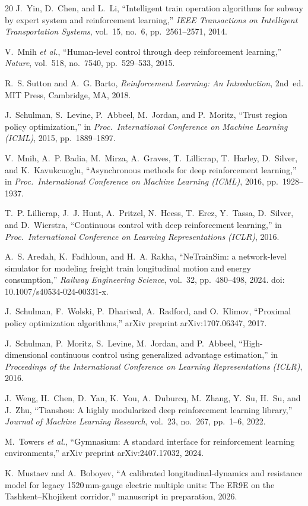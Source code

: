 \documentclass[11pt,a4paper]{article}
\begin{document}
\begin{thebibliography}{20}
J.~Yin, D.~Chen, and L.~Li,
``Intelligent train operation algorithms for subway by expert system and
reinforcement learning,''
\emph{IEEE Transactions on Intelligent Transportation Systems}, vol.~15,
no.~6, pp.~2561--2571, 2014.

V.~Mnih \emph{et al.},
``Human-level control through deep reinforcement learning,''
\emph{Nature}, vol.~518, no.~7540, pp.~529--533, 2015.

R.~S. Sutton and A.~G. Barto,
\emph{Reinforcement Learning: An Introduction}, 2nd~ed.
MIT Press, Cambridge, MA, 2018.

J.~Schulman, S.~Levine, P.~Abbeel, M.~Jordan, and P.~Moritz,
``Trust region policy optimization,''
in \emph{Proc.\ International Conference on Machine Learning (ICML)}, 2015,
pp.~1889--1897.

V.~Mnih, A.~P. Badia, M.~Mirza, A.~Graves, T.~Lillicrap, T.~Harley,
D.~Silver, and K.~Kavukcuoglu,
``Asynchronous methods for deep reinforcement learning,''
in \emph{Proc.\ International Conference on Machine Learning (ICML)}, 2016,
pp.~1928--1937.

T.~P. Lillicrap, J.~J. Hunt, A.~Pritzel, N.~Heess, T.~Erez, Y.~Tassa,
D.~Silver, and D.~Wierstra,
``Continuous control with deep reinforcement learning,''
in \emph{Proc.\ International Conference on Learning Representations (ICLR)},
2016.

A.~S. Aredah, K.~Fadhloun, and H.~A. Rakha,
``NeTrainSim: a network-level simulator for modeling freight train
longitudinal motion and energy consumption,''
\emph{Railway Engineering Science}, vol.~32, pp.~480--498, 2024.
doi: 10.1007/s40534-024-00331-x.

J.~Schulman, F.~Wolski, P.~Dhariwal, A.~Radford, and O.~Klimov,
``Proximal policy optimization algorithms,''
arXiv preprint arXiv:1707.06347, 2017.

J.~Schulman, P.~Moritz, S.~Levine, M.~Jordan, and P.~Abbeel,
``High-dimensional continuous control using generalized advantage
estimation,'' in \emph{Proceedings of the International Conference on
Learning Representations (ICLR)}, 2016.

J.~Weng, H.~Chen, D.~Yan, K.~You, A.~Duburcq, M.~Zhang, Y.~Su, H.~Su, and
J.~Zhu, ``Tianshou: A highly modularized deep reinforcement learning
library,'' \emph{Journal of Machine Learning Research}, vol.~23, no.~267,
pp.~1--6, 2022.

M.~Towers \emph{et al.},
``Gymnasium: A standard interface for reinforcement learning environments,''
arXiv preprint arXiv:2407.17032, 2024.

K.~Mustaev and A.~Boboyev,
``A calibrated longitudinal-dynamics and resistance model for legacy
1520\,mm-gauge electric multiple units: The ER9E on the
Tashkent--Khojikent corridor,'' manuscript in preparation, 2026.

\end{thebibliography}
\end{document}
